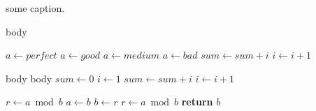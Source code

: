\begin{algorithm}[ht]
\caption{some caption.}
\begin{algorithmic}[1]

\State body
\EndFor

\ENDFOR
\ENDFOR
\ENDFOR

\State $a\gets perfect$
\State $a\gets good$
\State $a\gets medium$
\State $a\gets bad$
\Else
{}
\State $sum\gets sum+i$
\State $i\gets i+1$
\EndWhile
\EndIf

\State body
\Loop
\State body
\EndLoop
\State $sum\gets 0$
\State $i\gets 1$
\Repeat
\State $sum\gets sum+i$
\State $i\gets i+1$
\EndFor

\State $r\gets a\bmod b$
\State $a\gets b$
\State $b\gets r$
\State $r\gets a\bmod b$
\EndWhile
\State \textbf{return} $b$
\EndFunction
\end{algorithmic}
\end{algorithm}
